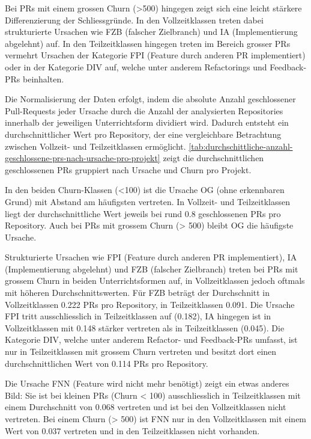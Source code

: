 Bei PRs mit einem grossen Churn (>500) hingegen zeigt sich eine leicht stärkere Differenzierung der Schliessgründe.
In den Vollzeitklassen treten dabei strukturierte Ursachen wie FZB (falscher Zielbranch) und IA (Implementierung abgelehnt) auf. 
In den Teilzeitklassen hingegen treten im Bereich grosser PRs vermehrt Ursachen der Kategorie FPI (Feature durch anderen PR implementiert) oder in der Kategorie DIV auf, welche unter anderem Refactorings und Feedback-PRs beinhalten.


Die Normalisierung der Daten erfolgt, indem die absolute Anzahl geschlossener Pull-Requests jeder Ursache durch die Anzahl der analysierten Repositories innerhalb der jeweiligen Unterrichtsform dividiert wird. Dadurch entsteht ein durchschnittlicher Wert pro Repository, der eine vergleichbare Betrachtung zwischen Voll\-zeit- und Teilzeitklassen ermöglicht. \autoref{tab:durchschittliche-anzahl-geschlossene-prs-nach-ursache-pro-projekt} zeigt die durchschnittlichen geschlossenen PRs gruppiert nach Ursache und Churn pro Projekt.  

In den beiden Churn-Klassen (<100) ist die Ursache OG (ohne erkennbaren Grund) mit Abstand am häufigsten vertreten. In Vollzeit- und Teilzeitklassen liegt der durchschnittliche Wert jeweils bei rund 0.8 geschlossenen PRs pro Repository. Auch bei PRs mit grossem Churn (> 500) bleibt OG die häufigste Ursache.

Strukturierte Ursachen wie FPI (Feature durch anderen PR implementiert), IA (Implementierung abgelehnt) und FZB (falscher Zielbranch) treten bei PRs mit grossem Churn in beiden Unterrichtsformen auf, in Vollzeitklassen jedoch oftmals mit höheren Durchschnittswerten. Für FZB beträgt der Durchschnitt in Vollzeitklassen 0.222 PRs pro Repository, in Teilzeitklassen 0.091. Die Ursache FPI tritt ausschliesslich in Teilzeitklassen auf (0.182), IA hingegen ist in Vollzeitklassen mit 0.148 stärker vertreten als in Teilzeitklassen (0.045). Die Kategorie DIV, welche unter anderem Refactor- und Feedback-PRs umfasst, ist nur in Teilzeitklassen mit grossem Churn vertreten und besitzt dort einen durchschnittlichen Wert von 0.114 PRs pro Repository.

Die Ursache FNN (Feature wird nicht mehr benötigt) zeigt ein etwas anderes Bild: Sie ist bei kleinen PRs (Churn < 100) ausschliesslich in Teilzeitklassen mit einem Durchschnitt von 0.068 vertreten und ist bei den Vollzeitklassen nicht vertreten. Bei einem Churn (> 500) ist FNN nur in den Vollzeitklassen mit einem Wert von 0.037 vertreten und in den Teilzeitklassen nicht vorhanden.

